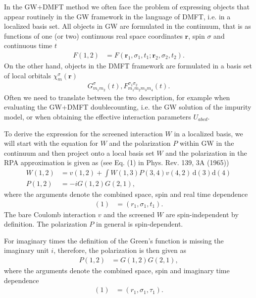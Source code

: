 \documentclass[12pt,a4paper]{scrartcl}
\numberwithin{equation}{section}
\begin{document}
In the GW+DMFT method we often face the problem of expressing objects that appear
routinely in the GW framework in the language of DMFT, i.e. in a localized basis set.
All objects in GW are formulated in the continuum, that is as functions
of one (or two) continuous real space coordinates $\mathbf{r}$, spin $\sigma$ and continuous time $t$
\begin{align}
 F(1,2) &= F(\mathbf{r}_1,\sigma_1,t_1;\mathbf{r}_2,\sigma_2,t_2).
\end{align}
On the other hand, objects in the DMFT framework are formulated in 
a basis set of local orbitals $\chi^{\sigma}_m(\mathbf{r})$
\begin{align}
 G^{\sigma}_{m_1m_2}(t), F^{\sigma_1\sigma_2}_{m_1m_2m_3m_4}(t).
\end{align}
Often we need to translate between the two description, for example
when evaluating the GW+DMFT doublecounting, i.e. the GW solution of
the impurity model, or when obtaining the effective interaction
parameters $U_{abcd}$.

To derive the expression for the screened interaction $W$ in a localized basis,
we will start with the equation for $W$ and the polarization $P$ within GW in the
continuum and then project onto a local basis set
$W$ and the polarization in the RPA approximation is given as
(see Eq. (1) in Phys. Rev. 139, 3A (1965))
\begin{align}
W(1,2)
 &= v(1,2)
  + \int  W(1,3) P(3,4) v(4,2) \, \mathrm{d}(3)\mathrm{d}(4) \label{eq:w_continuum} \\
%
P(1,2) &= -i G(1,2)G(2,1),
\end{align}
where the arguments denote the combined space, spin and real time dependence
\begin{align}
 (1) &= (r_1,\sigma_1,t_1).
\end{align}
The bare Coulomb interaction $v$ and the screened $W$ are spin-independent by definition.
The polarization $P$ in general is spin-dependent.

For imaginary times the definition of the Green's function
is missing the imaginary unit $i$, therefore, the polarization is then
given as
\begin{align}
P(1,2) &=  G(1,2)G(2,1),
\end{align}
where the arguments denote the combined space, spin and imaginary time dependence
\begin{align}
 (1) &= (r_1,\sigma_1,\tau_1).
\end{align}

\end{document}
